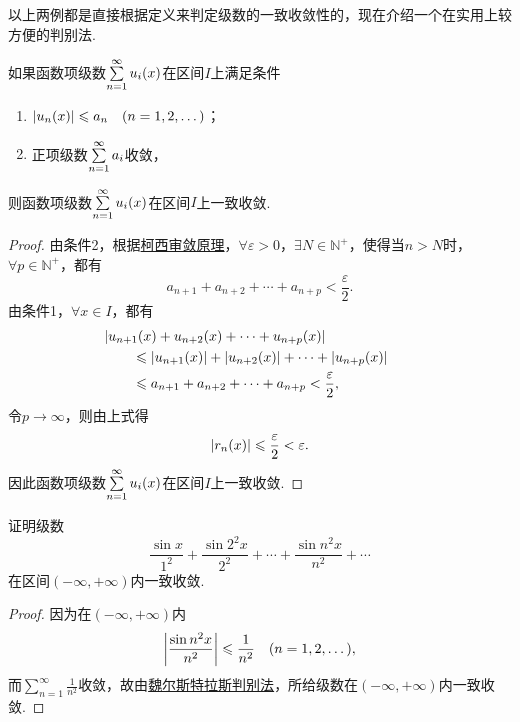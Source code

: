 以上两例都是直接根据定义来判定级数的一致收敛性的，现在介绍一个在实用上较方便的判别法.
\begin{theorem}\label{theorem:无穷级数.魏尔斯特拉斯判别法}
如果函数项级数\(\sum\limits_{n=1}^{\infty} u_i(x)\)在区间\(I\)上满足条件\begin{enumerate}
\item \(\abs{u_n(x)} \leqslant a_n \quad(n=1,2,\dotsc)\)；
\item 正项级数\(\sum\limits_{n=1}^{\infty} a_i\)收敛，%
\end{enumerate}
则函数项级数\(\sum\limits_{n=1}^{\infty} u_i(x)\)在区间\(I\)上一致收敛.
\begin{proof}
由条件2，根据\hyperref[theorem:无穷级数.级数的柯西审敛原理]{柯西审敛原理}，\(\forall\varepsilon>0\)，\(\exists N \in \mathbb{N}^+\)，使得当\(n > N\)时，\(\forall p \in \mathbb{N}^+\)，都有\[
a_{n+1} + a_{n+2} + \dotsb + a_{n+p} < \frac{\varepsilon}{2}.
\]由条件1，\(\forall x \in I\)，都有\begin{align*}
&\hspace{-20pt}\abs{u_{n+1}(x) + u_{n+2}(x) + \dotsb + u_{n+p}(x)} \\
&\leqslant \abs{u_{n+1}(x)} + \abs{u_{n+2}(x)} + \dotsb + \abs{u_{n+p}(x)} \\
&\leqslant a_{n+1} + a_{n+2} + \dotsb + a_{n+p} < \frac{\varepsilon}{2},
\end{align*}令\(p\to\infty\)，则由上式得\[
\abs{r_n(x)} \leqslant \frac{\varepsilon}{2} < \varepsilon.
\]因此函数项级数\(\sum\limits_{n=1}^{\infty} u_i(x)\)在区间\(I\)上一致收敛.
\end{proof}
\end{theorem}

\begin{example}
证明级数\[
\frac{\sin x}{1^2}
+ \frac{\sin 2^2 x}{2^2}
+ \dotsb
+ \frac{\sin n^2 x}{n^2}
+ \dotsb
\]在区间\((-\infty,+\infty)\)内一致收敛.
\begin{proof}
因为在\((-\infty,+\infty)\)内\[
\abs{\frac{\sin n^2 x}{n^2}} \leqslant \frac{1}{n^2}
\quad(n=1,2,\dotsc),
\]而\(\sum\limits_{n=1}^{\infty} \frac{1}{n^2}\)收敛，故由\hyperref[theorem:无穷级数.魏尔斯特拉斯判别法]{魏尔斯特拉斯判别法}，所给级数在\((-\infty,+\infty)\)内一致收敛.
\end{proof}
\end{example}

